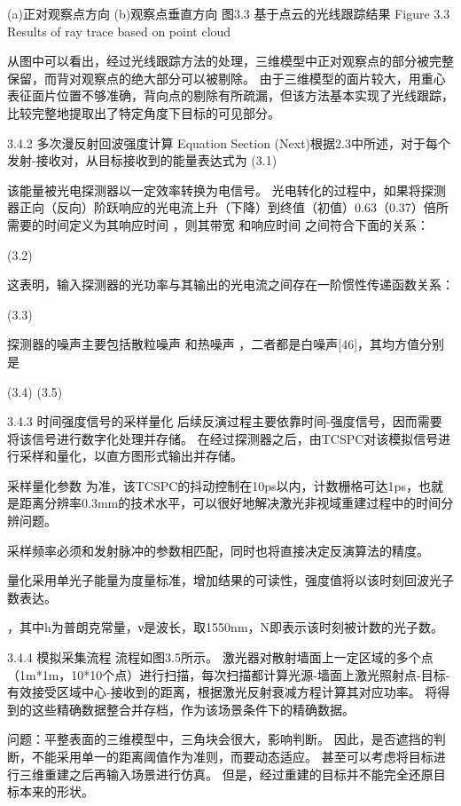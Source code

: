    
(a)正对观察点方向                (b)观察点垂直方向
图3.3  基于点云的光线跟踪结果
Figure 3.3 Results of ray trace based on point cloud

 





从图中可以看出，经过光线跟踪方法的处理，三维模型中正对观察点的部分被完整保留，而背对观察点的绝大部分可以被剔除。
由于三维模型的面片较大，用重心表征面片位置不够准确，背向点的剔除有所疏漏，但该方法基本实现了光线跟踪，比较完整地提取出了特定角度下目标的可见部分。


3.4.2 多次漫反射回波强度计算
Equation Section (Next)根据2.3中所述，对于每个发射-接收对，从目标接收到的能量表达式为
	  	 (3.1)

该能量被光电探测器以一定效率转换为电信号。
光电转化的过程中，如果将探测器正向（反向）阶跃响应的光电流上升（下降）到终值（初值）0.63（0.37）倍所需要的时间定义为其响应时间 ，则其带宽 和响应时间 之间符合下面的关系：

	  	(3.2)

这表明，输入探测器的光功率与其输出的光电流之间存在一阶惯性传递函数关系：

	  	(3.3)

探测器的噪声主要包括散粒噪声 和热噪声 ，二者都是白噪声[46]，其均方值分别是

	  	(3.4)
	  	(3.5)

3.4.3 时间强度信号的采样量化
后续反演过程主要依靠时间-强度信号，因而需要将该信号进行数字化处理并存储。
在经过探测器之后，由TCSPC对该模拟信号进行采样和量化，以直方图形式输出并存储。

采样量化参数 为准，该TCSPC的抖动控制在10ps以内，计数栅格可达1ps，也就是距离分辨率0.3mm的技术水平，可以很好地解决激光非视域重建过程中的时间分辨问题。

采样频率必须和发射脉冲的参数相匹配，同时也将直接决定反演算法的精度。

量化采用单光子能量为度量标准，增加结果的可读性，强度值将以该时刻回波光子数表达。

 ，其中h为普朗克常量，ν是波长，取1550nm，N即表示该时刻被计数的光子数。


3.4.4 模拟采集流程
流程如图3.5所示。
激光器对散射墙面上一定区域的多个点（1m*1m，10*10个点）进行扫描，每次扫描都计算光源-墙面上激光照射点-目标-有效接受区域中心-接收到的距离，根据激光反射衰减方程计算其对应功率。
将得到的这些精确数据整合并存档，作为该场景条件下的精确数据。

问题：平整表面的三维模型中，三角块会很大，影响判断。
因此，是否遮挡的判断，不能采用单一的距离阈值作为准则，而要动态适应。
甚至可以考虑将目标进行三维重建之后再输入场景进行仿真。
但是，经过重建的目标并不能完全还原目标本来的形状。


